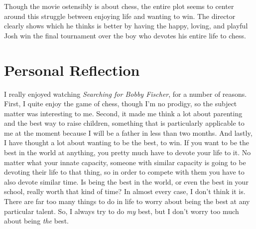 \documentclass[onecolumn, 12pt]{article}
\begin{document}
Though the movie ostensibly is about chess, the entire plot seems to center
around this struggle between enjoying life and wanting to win.  The director
clearly shows which he thinks is better by having the happy, loving, and
playful Josh win the final tournament over the boy who devotes his entire life
to chess.

\section*{Personal Reflection}

I really enjoyed watching \emph{Searching for Bobby Fischer}, for a number of
reasons.  First, I quite enjoy the game of chess, though I'm no prodigy, so the
subject matter was interesting to me.  Second, it made me think a lot about
parenting and the best way to raise children, something that is particularly
applicable to me at the moment because I will be a father in less than two
months.  And lastly, I have thought a lot about wanting to be the best, to win.
If you want to be the best in the world at anything, you pretty much have to
devote your life to it.  No matter what your innate capacity, someone with
similar capacity is going to be devoting their life to that thing, so in order
to compete with them you have to also devote similar time.  Is being the best
in the world, or even the best in your school, really worth that kind of time?
In almost every case, I don't think it is.  There are far too many things to do
in life to worry about being the best at any particular talent.  So, I always
try to do \emph{my} best, but I don't worry too much about being \emph{the}
best.
\end{document}
